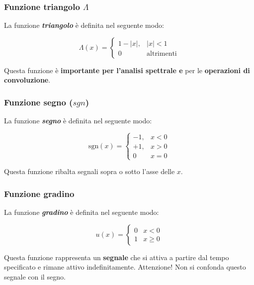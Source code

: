 \documentclass[a4paper]{article}
\begin{document}
	\subsubsection{Funzione triangolo $\Lambda$}
	
	La funzione \textbf{\emph{triangolo}} è definita nel seguente modo:
	
	\begin{equation*}
		\Lambda(x) =
		\begin{cases}
			1-|x|, 	& |x| < 1 \\
			0		& \text{altrimenti}
		\end{cases}
	\end{equation*}

	\noindent
	Questa funzione è \textbf{importante per l'analisi spettrale e} per le \textbf{operazioni di convoluzione}.
	
	\subsubsection{Funzione segno ($sgn$)}
	
	La funzione \textbf{\emph{segno}} è definita nel seguente modo:
	
	\begin{equation*}
		\mathrm{sgn}(x) =
		\begin{cases}
			-1, 	& x < 0 \\
			+1,		& x > 0 \\
			0		& x = 0
		\end{cases}
	\end{equation*}
	
	\noindent
	Questa funzione ribalta segnali sopra o sotto l'asse delle $x$.
	
	\subsubsection{Funzione gradino}
	
	La funzione \textbf{\emph{gradino}} è definita nel seguente modo:
	
	\begin{equation*}
		u(x) =
		\begin{cases}
			0 & x < 0 \\
			1 & x \ge 0
		\end{cases}
	\end{equation*}
	
	\noindent
	Questa funzione rappresenta un \textbf{segnale} che si attiva a partire dal tempo specificato e rimane attivo indefinitamente. Attenzione! Non si confonda questo segnale con il segno.
	
\end{document}
